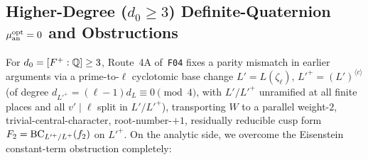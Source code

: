 \subsection{Higher-Degree ($d_0 \ge 3$) Definite-Quaternion $\mu_{\mathrm{an}}^{\mathrm{opt}} = 0$ and Obstructions}\label{sec:5:higher}

For $d_0 = [F^+:\mathbb{Q}] \ge 3$, Route~4A of~\texttt{F04} fixes a parity mismatch in earlier arguments via a prime-to-$\ell$ cyclotomic base change $L' = L(\zeta_\ell)$, $L'^+ = (L')^{\langle c \rangle}$ (of degree $d_{L'^+} = (\ell-1)d_L \equiv 0 \pmod 4$, with $L'/L'^+$ unramified at all finite places and all $v' \mid \ell$ split in $L'/L'^+$), transporting $W$ to a parallel weight-$2$, trivial-central-character, root-number-$+1$, residually reducible cusp form $F_2 = \mathrm{BC}_{L'^+/L^+}(f_2)$ on $L'^+$. On the analytic side, we overcome the Eisenstein constant-term obstruction completely:

